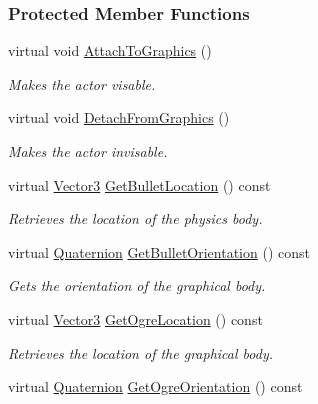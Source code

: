 \subsubsection*{Protected Member Functions}
\begin{DoxyCompactItemize}
\item 
virtual void \hyperlink{classMezzanine_1_1ActorBase_a040cc440d23400c7f129b318a8a84e97}{AttachToGraphics} ()
\begin{DoxyCompactList}\small\item\em Makes the actor visable. \item\end{DoxyCompactList}\item 
virtual void \hyperlink{classMezzanine_1_1ActorBase_a957ed99e5f67ac3fca3ba8a9b025fe48}{DetachFromGraphics} ()
\begin{DoxyCompactList}\small\item\em Makes the actor invisable. \item\end{DoxyCompactList}\item 
virtual \hyperlink{classMezzanine_1_1Vector3}{Vector3} \hyperlink{classMezzanine_1_1ActorBase_a9f110d013ed871809258dfc55f8b7276}{GetBulletLocation} () const 
\begin{DoxyCompactList}\small\item\em Retrieves the location of the physics body. \item\end{DoxyCompactList}\item 
virtual \hyperlink{classMezzanine_1_1Quaternion}{Quaternion} \hyperlink{classMezzanine_1_1ActorBase_a32fc60215d8bcd3151b3158d481ce0ef}{GetBulletOrientation} () const 
\begin{DoxyCompactList}\small\item\em Gets the orientation of the graphical body. \item\end{DoxyCompactList}\item 
virtual \hyperlink{classMezzanine_1_1Vector3}{Vector3} \hyperlink{classMezzanine_1_1ActorBase_a8095a72bdfcf7fd02953423ae17acd01}{GetOgreLocation} () const 
\begin{DoxyCompactList}\small\item\em Retrieves the location of the graphical body. \item\end{DoxyCompactList}\item 
virtual \hyperlink{classMezzanine_1_1Quaternion}{Quaternion} \hyperlink{classMezzanine_1_1ActorBase_ae76175894f1c2bc4372ec1ebd5ede83d}{GetOgreOrientation} () const 

\end{DoxyCompactItemize}
